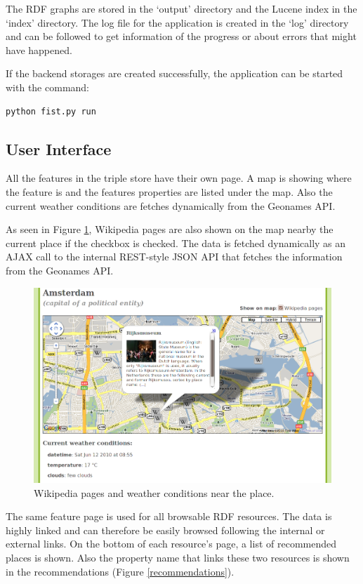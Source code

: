 \documentclass[a4paper,12pt]{article}
\begin{document}
\noindent The RDF graphs are stored in the `output' directory and the
Lucene index in the `index' directory. The log file for the
application is created in the `log' directory and can be followed to
get information of the progress or about errors that might have
happened.

If the backend storages are created successfully, the application can
be started with the command:

\begin{verbatim}
python fist.py run
\end{verbatim}

\subsection{User Interface}

All the features in the triple store have their own page. A map is
showing where the feature is and the features properties are listed
under the map. Also the current weather conditions are fetches
dynamically from the Geonames API.

As seen in Figure \ref{feature}, Wikipedia pages are also shown on the
map nearby the current place if the checkbox is checked. The data is
fetched dynamically as an AJAX call to the internal REST-style JSON
API that fetches the information from the Geonames API.

\begin{figure}[h]
  \includegraphics[width=\linewidth]{img/feature.png}
  \caption{Wikipedia pages and weather conditions near the place.}
  \label{feature}
\end{figure}

\noindent The same feature page is used for all browsable RDF
resources. The data is highly linked and can therefore be easily
browsed following the internal or external links. On the bottom of
each resource's page, a list of recommended places is shown. Also the
property name that links these two resources is shown in the
recommendations (Figure \ref{recommendations}).
\end{document}
